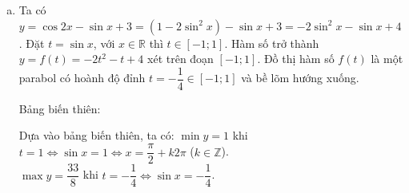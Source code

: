 \begin{vd}
{\begin{enumerate}[a)]
			      Bảng biến thiên:
			      \begin{center}
			      \end{center}

			      Dựa vào bảng biến thiên, ta có:
			      $\min y = -\dfrac{25}{8}$ khi $t = -\dfrac{3}{4} \Leftrightarrow \cos x = -\dfrac{3}{4}$.\\
			      $\max y = 3$ khi $t = 1 \Leftrightarrow \cos x = 1 \Leftrightarrow x = k2\pi$ ($k \in \mathbb{Z}$).

			\item Ta có $y = \cos 2x - \sin x + 3 = (1 - 2\sin^2 x) - \sin x + 3 = -2\sin^2 x - \sin x + 4$.
			      Đặt $t = \sin x$, với $x \in \mathbb{R}$ thì $t \in [-1; 1]$.
			      Hàm số trở thành $y = f(t) = -2t^2 - t + 4$ xét trên đoạn $[-1; 1]$.
			      Đồ thị hàm số $f(t)$ là một parabol có hoành độ đỉnh $t = -\dfrac{1}{4} \in [-1; 1]$ và bề lõm hướng xuống.

			      Bảng biến thiên:
			      \begin{center}
			      \end{center}

			      Dựa vào bảng biến thiên, ta có:
			      $\min y = 1$ khi $t = 1 \Leftrightarrow \sin x = 1 \Leftrightarrow x = \dfrac{\pi}{2} + k2\pi$ ($k \in \mathbb{Z}$).\\
			      $\max y = \dfrac{33}{8}$ khi $t = -\dfrac{1}{4} \Leftrightarrow \sin x = -\dfrac{1}{4}$.
		\end{enumerate}
	}
\end{vd} 
